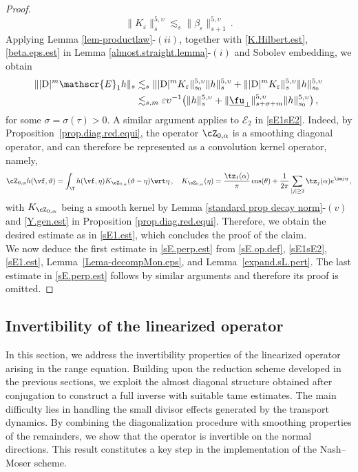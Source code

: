 \documentclass[a4paper,reqno,10pt]{article}
\newcommand{\sE}{\mathscr{E}}
\begin{document}
\begin{proof}
    \begin{equation}
        \| K_{\varepsilon} \|_{s}^{5,\upsilon} \lesssim_{s} \| \beta_{\varepsilon} \|_{s+1}^{5,\upsilon}\,.\label{K.Hilbert.est}
    \end{equation}
    Applying Lemma \ref{lem-productlaw}-$(ii)$, together with \eqref{K.Hilbert.est}, \eqref{beta.eps.est} in Lemma \eqref{almost.straight.lemma}-$(i)$ and Sobolev embedding, we obtain  
    \begin{align}
        \||{\rm D}|^{m}\sE_{1} h \|_{s} & \lesssim_{s} \| |{\rm D}|^{m}K_{\varepsilon} \|_{s_0}^{5,\upsilon} \| h\|_{s}^{5,\upsilon} + \| |{\rm D}|^{m}K_{\varepsilon} \|_{s}^{5,\upsilon} \| h\|_{s_0}^{5,\upsilon} \\
        & \lesssim_{s,m} \varepsilon\upsilon^{-1} \big( \| h\|_{s}^{5,\upsilon}  + \| \underline{\fu}_{\perp}\|_{s+\sigma+m}^{5,\upsilon} \| h\|_{s_0}^{5,\upsilon} \big) \,, \label{sE1.est}
    \end{align}
    for some $\sigma=\sigma(\tau)>0$. A similar argument applies to $\sE_{2}$ in \eqref{sE1sE2}. Indeed, by Proposition~\ref{prop.diag.red.equi}, the operator $\cZ_{0,\alpha}$ is a smoothing diagonal operator, and can therefore be represented as a convolution kernel operator, namely,
    \begin{equation}
        \cZ_{0,\alpha}h(\vf,\vartheta) = \int_{\T} h(\vf,\eta) K_{\cZ_{0,\alpha}}(\vartheta-\eta) \wrt \eta\,, \quad K_{\cZ_{0,\alpha}}(\eta) = \frac{\tz_{1}(\alpha)}{\pi} \cos(\theta)+ \frac{1}{2\pi}\sum_{|j|\geq 2} \tz_{j}(\alpha)e^{\im j \eta} \,,
    \end{equation}
    with $K_{\cZ_{0,\alpha}}$ being a smooth kernel by Lemma \ref{standard prop decay norm}-$(v)$ and \eqref{Y.gen.est} in Proposition \ref{prop.diag.red.equi}. Therefore, we obtain the desired estimate as in \eqref{sE1.est}, which concludes the proof of the claim.\\
    We now deduce the first estimate in \eqref{sE.perp.est} from \eqref{sE.op.def}, \eqref{sE1sE2}, \eqref{sE1.est}, Lemma~\ref{Lema-decompMon.eps}, and Lemma~\ref{expand.sL.pert}. The last estimate in \eqref{sE.perp.est} follows by similar arguments and  therefore its proof is omitted.
\end{proof}



\subsection{Invertibility of the linearized operator}\label{sect.almost.inv}
In this section, we address the invertibility properties of the linearized operator arising in the range equation. Building upon the reduction scheme developed in the previous sections, we exploit the almost diagonal structure obtained after conjugation to construct a full inverse with suitable tame estimates. 
The main difficulty lies in handling the small divisor effects generated by the transport dynamics. By combining the diagonalization procedure with smoothing properties of the remainders, we show that the operator is invertible on the normal directions. This result constitutes a key step in the implementation of the Nash–Moser scheme.
\end{document}
